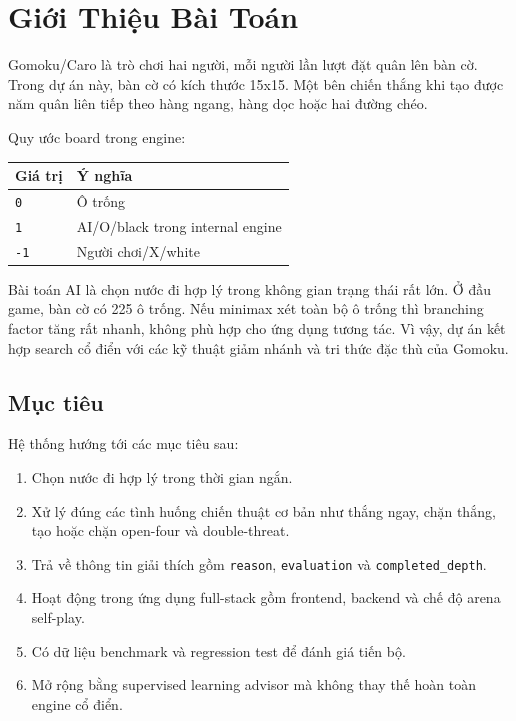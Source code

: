 \documentclass[12pt,a4paper]{article}
\begin{document}
\section{Giới Thiệu Bài Toán}
\label{sec:problem}

Gomoku/Caro là trò chơi hai người, mỗi người lần lượt đặt quân lên bàn cờ. Trong dự án này, bàn cờ có kích thước 15x15. Một bên chiến thắng khi tạo được năm quân liên tiếp theo hàng ngang, hàng dọc hoặc hai đường chéo.

Quy ước board trong engine:

\begin{longtable}{p{}p{}}
\toprule
\textbf{Giá trị} & \textbf{Ý nghĩa} \\
\midrule
\texttt{0} & Ô trống \\
\texttt{1} & AI/O/black trong internal engine \\
\texttt{-1} & Người chơi/X/white \\
\bottomrule
\end{longtable}

Bài toán AI là chọn nước đi hợp lý trong không gian trạng thái rất lớn. Ở đầu game, bàn cờ có 225 ô trống. Nếu minimax xét toàn bộ ô trống thì branching factor tăng rất nhanh, không phù hợp cho ứng dụng tương tác. Vì vậy, dự án kết hợp search cổ điển với các kỹ thuật giảm nhánh và tri thức đặc thù của Gomoku.

\subsection{Mục tiêu}

Hệ thống hướng tới các mục tiêu sau:

\begin{enumerate}[leftmargin=*]
  \item Chọn nước đi hợp lý trong thời gian ngắn.
  \item Xử lý đúng các tình huống chiến thuật cơ bản như thắng ngay, chặn thắng, tạo hoặc chặn open-four và double-threat.
  \item Trả về thông tin giải thích gồm \texttt{reason}, \texttt{evaluation} và \texttt{completed\_depth}.
  \item Hoạt động trong ứng dụng full-stack gồm frontend, backend và chế độ arena self-play.
  \item Có dữ liệu benchmark và regression test để đánh giá tiến bộ.
  \item Mở rộng bằng supervised learning advisor mà không thay thế hoàn toàn engine cổ điển.
\end{enumerate}
\end{document}
